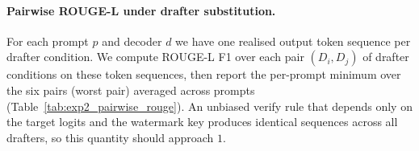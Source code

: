 \paragraph{Pairwise ROUGE-L under drafter substitution.}
For each prompt $p$ and decoder $d$ we have one realised output token sequence
per drafter condition. We compute ROUGE-L F1 over each pair $(D_i,D_j)$ of
drafter conditions on these token sequences, then report the per-prompt
minimum over the six pairs (worst pair) averaged across prompts
(Table~\ref{tab:exp2_pairwise_rouge}). An unbiased verify rule that depends
only on the target logits and the watermark key produces identical sequences
across all drafters, so this quantity should approach $1$.

\begin{table}[h]
\centering
\caption{\textbf{Output quality.}
LPPL$\downarrow$ under target.
ROUGE-L$\uparrow$ vs.\ gold \texttt{highlights}.
AATPS$\uparrow$ accepted target tokens per step.}
\label{tab:exp1_quality}
\small
\setlength{\tabcolsep}{4pt}
\end{table}

